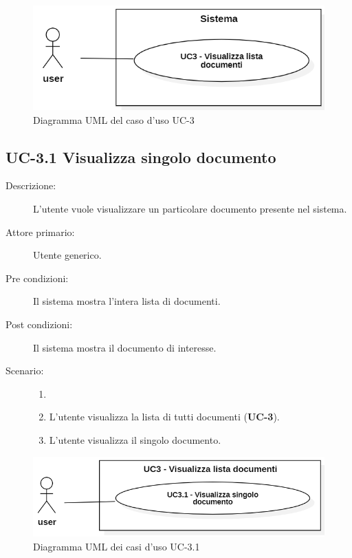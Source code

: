 \begin{figure}[H]
    \centering
    \includegraphics[width=0.8\linewidth]{UC3.PNG}
    \caption{Diagramma UML del caso d'uso UC-3}
    \label{fig:UC3}
\end{figure}

\subsection{UC-3.1 Visualizza singolo documento}
\begin{description}
    \item[Descrizione:] L'utente vuole visualizzare un particolare documento presente nel sistema.
    \item[Attore primario:] Utente generico.
    \item[Pre condizioni:] Il sistema mostra l’intera lista di documenti.
    \item[Post condizioni:] Il sistema mostra il documento di interesse.
    \item[Scenario:]
    \begin{enumerate}
        \item[]
        \item L’utente visualizza la lista di tutti documenti (\textbf{UC-3}).
        \item L'utente visualizza il singolo documento.
    \end{enumerate} 
\end{description}

\begin{figure}[H]
    \centering
    \includegraphics[width=0.8\linewidth]{UC3.1.PNG}
    \caption{Diagramma UML dei casi d'uso UC-3.1}
    \label{fig:UC3.1}
\end{figure}

